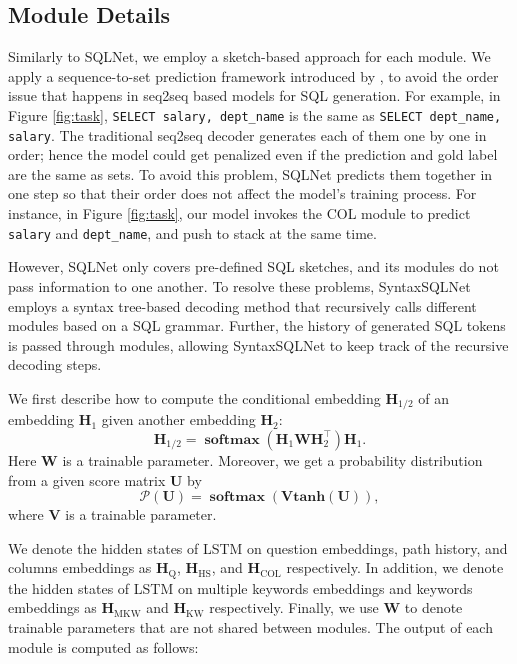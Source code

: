 \documentclass[11pt,a4paper]{article}
\DeclareMathOperator{\softmax}{\textbf{softmax}}
\begin{document}
\subsection{Module Details}

Similarly to SQLNet, we employ a sketch-based approach for each module. We apply a sequence-to-set prediction framework introduced by \cite{Xu2017}, to avoid the order issue that happens in seq2seq based models for SQL generation.
For example, in Figure \ref{fig:task}, \texttt{SELECT salary, dept\_name} is the same as \texttt{SELECT dept\_name, salary}.
The traditional seq2seq decoder generates each of them one by one in order; hence the model could get penalized even if the prediction and gold label are the same as sets.
To avoid this problem, SQLNet predicts them together in one step so that their order does not affect the model's training process.
For instance, in Figure \ref{fig:task}, our model invokes the COL module to predict \texttt{salary} and \texttt{dept\_name}, and push to stack at the same time.

However, SQLNet only covers pre-defined SQL sketches, and its modules do not pass information to one another. 
To resolve these problems, SyntaxSQLNet employs a syntax tree-based decoding method that recursively calls different modules based on a SQL grammar. Further, the history of generated SQL tokens is passed through modules, allowing SyntaxSQLNet to keep track of the recursive decoding steps.


We first describe how to compute the conditional embedding $\mathbf{H}_{1/2}$ of an embedding $\mathbf{H}_1$ given another embedding $\mathbf{H}_2$:
$$
\mathbf{H}_{1/2} = \softmax(\mathbf{H}_{1}\mathbf{W} \mathbf{H}_{2}^\top) \mathbf{H}_{1}.
$$
Here $\mathbf{W}$ is a trainable parameter.
Moreover, we get a probability distribution from a given score matrix $\mathbf{U}$ by
$$
\mathcal{P}(\mathbf{U}) = \softmax \left(\mathbf{V} \textbf{tanh}(\mathbf{U}) \right),
$$
where $\mathbf{V}$ is a trainable parameter. 

We denote the hidden states of LSTM on question embeddings, path history, and columns embeddings as $\mathbf{H}_{\textrm{Q}}$, $\mathbf{H}_{\textrm{HS}}$, and $\mathbf{H}_{\textrm{COL}}$ respectively. In addition, we denote the hidden states of LSTM on multiple keywords embeddings and keywords embeddings as $\mathbf{H}_{\textrm{MKW}}$ and $\mathbf{H}_{\textrm{KW}}$ respectively. Finally, we use 
$\mathbf{W}$ to denote trainable parameters that are not shared between modules. The output of each module is computed as follows:
\end{document}
